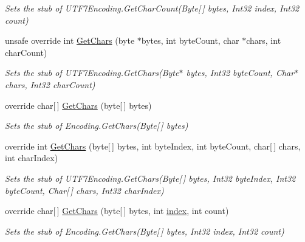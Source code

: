\begin{DoxyCompactItemize}
\begin{DoxyCompactList}\small\item\em Sets the stub of U\-T\-F7\-Encoding.\-Get\-Char\-Count(\-Byte\mbox{[}$\,$\mbox{]} bytes, Int32 index, Int32 count)\end{DoxyCompactList}\item 
unsafe override int \hyperlink{class_system_1_1_text_1_1_fakes_1_1_stub_u_t_f7_encoding_a41341a623a96bfd0910b4c048e99287d}{Get\-Chars} (byte $\ast$bytes, int byte\-Count, char $\ast$chars, int char\-Count)
\begin{DoxyCompactList}\small\item\em Sets the stub of U\-T\-F7\-Encoding.\-Get\-Chars(\-Byte$\ast$ bytes, Int32 byte\-Count, Char$\ast$ chars, Int32 char\-Count)\end{DoxyCompactList}\item 
override char\mbox{[}$\,$\mbox{]} \hyperlink{class_system_1_1_text_1_1_fakes_1_1_stub_u_t_f7_encoding_a7b6443b1e871535822ab6642f440372f}{Get\-Chars} (byte\mbox{[}$\,$\mbox{]} bytes)
\begin{DoxyCompactList}\small\item\em Sets the stub of Encoding.\-Get\-Chars(\-Byte\mbox{[}$\,$\mbox{]} bytes)\end{DoxyCompactList}\item 
override int \hyperlink{class_system_1_1_text_1_1_fakes_1_1_stub_u_t_f7_encoding_a1d76874307b559aee92ba8c48af69659}{Get\-Chars} (byte\mbox{[}$\,$\mbox{]} bytes, int byte\-Index, int byte\-Count, char\mbox{[}$\,$\mbox{]} chars, int char\-Index)
\begin{DoxyCompactList}\small\item\em Sets the stub of U\-T\-F7\-Encoding.\-Get\-Chars(\-Byte\mbox{[}$\,$\mbox{]} bytes, Int32 byte\-Index, Int32 byte\-Count, Char\mbox{[}$\,$\mbox{]} chars, Int32 char\-Index)\end{DoxyCompactList}\item 
override char\mbox{[}$\,$\mbox{]} \hyperlink{class_system_1_1_text_1_1_fakes_1_1_stub_u_t_f7_encoding_ac94ee46fba6e2d54aade1b4bcec12304}{Get\-Chars} (byte\mbox{[}$\,$\mbox{]} bytes, int \hyperlink{jquery-1_810_82-vsdoc_8js_a75bb12d1f23302a9eea93a6d89d0193e}{index}, int count)
\begin{DoxyCompactList}\small\item\em Sets the stub of Encoding.\-Get\-Chars(\-Byte\mbox{[}$\,$\mbox{]} bytes, Int32 index, Int32 count)\end{DoxyCompactList}\item 

\end{DoxyCompactItemize}
